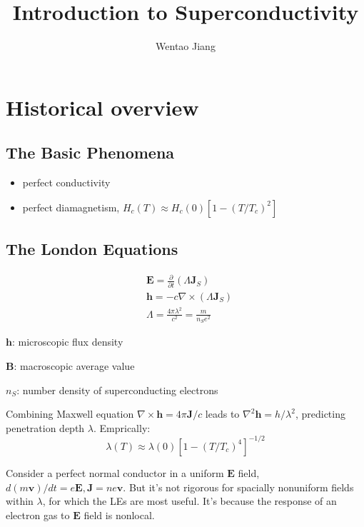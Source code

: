 \documentclass[8pt,a4paper,twocolumn]{article} %
\numberwithin{equation}{section} %
\begin{document}
\small
	\title{Introduction to Superconductivity}
	\author{Wentao Jiang}
	\date{}
	\maketitle
	\tableofcontents

	\section{Historical overview} %
	\label{sec:historical_overview}
		\subsection{The Basic Phenomena} %
		\label{sub:the_basic_phenomena}
			\begin{itemize}
				\item perfect conductivity
				\item perfect diamagnetism, $H_c(T) \approx H_c(0)\left[ 1-(T/T_c)^2 \right]$
			\end{itemize}


		\subsection{The London Equations} %
		\label{sub:the_london_equations}
			\begin{align}
				&\bm E = \frac{\partial}{\partial t}( \Lambda \bm J_S )\\
				&\bm h = -c \nabla\times (\Lambda \bm J_S)\\
				&\Lambda = \frac{4 \pi \lambda^2}{c^2}=\frac{m}{n_S e^2}
			\end{align}

			$\bm h$: microscopic flux density

			$\bm B$: macroscopic average value

			$n_S$: number density of superconducting electrons

			Combining Maxwell equation $ \nabla\times \bm h=4 \pi \bm J/c$ leads to $\nabla^2 \bm h = h/\lambda^2$, predicting penetration depth $ \lambda $. Emprically:
			\begin{equation}
				\lambda(T)\approx \lambda(0)\left[ 1-(T/T_c)^4 \right]^{-1/2}
			\end{equation}

			Consider a perfect normal conductor in a uniform $\bm E$ field, $d(m\bm v)/dt = e\bm E,\bm J=ne\bm v$. But it's not rigorous for spacially nonuniform fields within $\lambda$, for which the LEs are most useful. It's because the response of an electron gas to $\bm E$ field is nonlocal.
\end{document}
